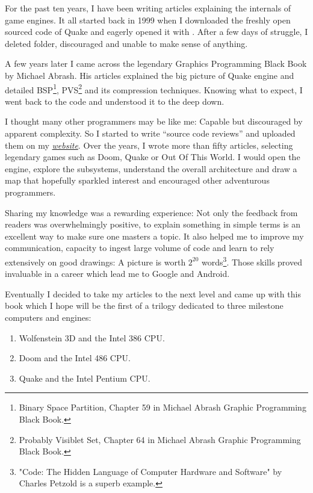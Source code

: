 \documentclass[book.tex]{subfiles}
\begin{document}
For the past ten years, I have been writing articles explaining the internals of game engines. It all started back in 1999 when I downloaded the freshly open sourced code of \mbox{Quake} and eagerly opened it with . After a few days of struggle, I deleted  folder, discouraged and unable to make sense of anything.

\bigskip

A few years later I came across the legendary Graphics Programming Black Book by Michael Abrash. His articles explained the big picture of Quake engine and detailed BSP\footnote{Binary Space Partition, Chapter 59 in Michael Abrash Graphic Programming Black Book.}, PVS\footnote{Probably Visiblet Set, Chapter 64 in Michael Abrash Graphic Programming Black Book.} and its compression techniques. Knowing what to expect, I went back to the code and understood it to the deep down.

\bigskip

I thought many other programmers may be like me: Capable but discouraged by apparent complexity. So I started to write ``source  code reviews'' and uploaded them on my
\href{http://fabiensanglard.net}{\textit{website}}. Over the years, I wrote more than fifty articles, selecting legendary games such as Doom, Quake or Out Of This World. I would open the engine, explore the subsystems, understand the overall architecture and draw a map that hopefully sparkled interest and encouraged other adventurous programmers.

\bigskip

Sharing my knowledge was a rewarding experience: Not only the feedback from readers was overwhelmingly positive, to explain something in simple terms is an excellent way to make sure one masters a topic. It also helped me to improve my communication, capacity to ingest large volume of code and learn to rely extensively on good drawings: A picture
is worth $2^{20}$ words\footnote{"Code: The Hidden Language of Computer Hardware and Software" by Charles Petzold is a superb example.}. Those skills proved invaluable in a career which lead me to Google and Android.

\bigskip

Eventually I decided to take my articles to the next level and came up with this book which I hope will be the first of a trilogy dedicated to three milestone computers and engines:

\begin{enumerate}
\item Wolfenstein 3D and the Intel 386 CPU.
\item Doom and the Intel 486 CPU.
\item Quake and the Intel Pentium CPU.
\end{enumerate}
\end{document}
